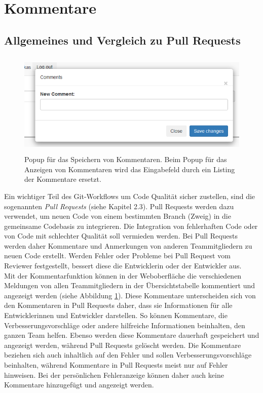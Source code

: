 \section{Kommentare}
\subsection{Allgemeines und Vergleich zu Pull Requests}
\begin{figure}[tp]
  \centering
  \includegraphics[height=5cm]{images/popup.PNG}
 \caption[Popup für das Speichern von Kommentaren]{Popup für das Speichern von Kommentaren. Beim Popup für das Anzeigen von Kommentaren wird das Eingabefeld durch ein Listing der Kommentare ersetzt.}
  \label{fig:table}
\end{figure}
Ein wichtiger Teil des Git-Workflows um Code Qualität sicher zustellen, sind die sogenannten \textit{Pull Requests} (siehe Kapitel 2.3). Pull Requests werden dazu verwendet, um neuen Code von einem bestimmten Branch (Zweig) in die gemeinsame Codebasis zu integrieren. Die Integration von fehlerhaften Code oder von Code mit schlechter Qualität soll vermieden werden. Bei Pull Requests werden daher Kommentare und Anmerkungen von anderen Teammitgliedern zu neuen Code erstellt. Werden Fehler oder Probleme bei Pull Request vom Reviewer festgestellt, bessert diese die Entwicklerin oder der Entwickler aus. \\ Mit der Kommentarfunktion können in der Weboberfläche die verschiedenen Meldungen von allen Teammitgliedern in der Übersichtstabelle kommentiert und angezeigt werden (siehe Abbildung \ref{fig:table}). Diese Kommentare unterscheiden sich von den Kommentaren in Pull Requests daher, dass sie Informationen für alle Entwicklerinnen und Entwickler darstellen. So können Kommentare, die Verbesserungsvorschläge oder andere hilfreiche Informationen beinhalten, den ganzen Team helfen. Ebenso werden diese Kommentare dauerhaft gespeichert und angezeigt werden, während Pull Requests gelöscht werden. Die Kommentare beziehen sich auch inhaltlich auf den Fehler und sollen Verbesserungsvorschläge beinhalten, während Kommentare in Pull Requests meist nur auf Fehler hinweisen. Bei der persönlichen Fehleranzeige können daher auch keine Kommentare hinzugefügt und angezeigt werden.
